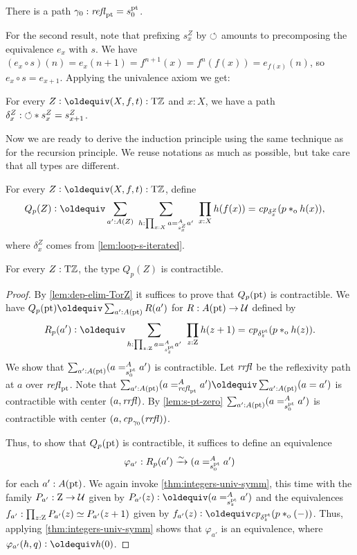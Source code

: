 \documentclass[a4,12pt]{amsart}
\begin{document}
\begin{lemma}\label{lem:s-pt-zero}
  There is a path $\gamma_0 : \mathop{{\it refl}_{{\mathord{\mathrm{pt}}}}} = s^{\mathord{\mathrm{pt}}}_0$. 
\end{lemma}

For the second result, note that prefixing $s^Z_x$ by ${\circlearrowleft}$ 
amounts to precomposing the equivalence $e_x$ with $s$. 
We have $(e_x\circ s)(n) = e_x(n+1) = f^{n+1}(x) = f^n(f(x)) =e_{f(x)}(n)$,
so $e_x\circ s = e_{x+1}$. Applying the univalence axiom we get:

\begin{lemma}\label{lem:loop-s-iterated}
  For every $Z\defeq(X,f,t):\TorZ$ and $x:X$, we have a path
  ${\delta^Z_x}: {\circlearrowleft} * s^Z_x = s^Z_{x+1}$. 
\end{lemma}

Now we are ready to derive the induction principle using the same 
technique as for the recursion principle. We reuse notations as much as
possible, but take care that all types are different.

\begin{definition}\label{def:guided-null-hmtps-dep}
For every $Z\defeq(X,f,t):\TorZ$, define
\begin{align*}\label{eq:TBD}
Q_p(Z)&\defeq \sum_{a' : A(Z)}~\sum_{h : \prod_{x:X} a =^A_{s^Z_x} a'}~\prod_{x:X} h(f(x)) = \cp{\delta^Z_x}(p\cto h(x)),
\end{align*}
where $\delta^Z_x$ comes from \cref{lem:loop-s-iterated}.
\end{definition}


\begin{lemma}\label{lem:guided-null-hmtps-dep}
  For every $Z:{\mathrm{T}\mathbb{Z}}$, the type $Q_p(Z)$ is contractible.
\end{lemma}
\begin{proof}
  By \cref{lem:dep-elim-TorZ} it suffices to prove that $Q_p({\mathord{\mathrm{pt}}})$ is contractible.
  We have $Q_p(\pt)\jdeq \sum_{a':A(\pt)} R(a')$ for $R : A({\mathord{\mathrm{pt}}}) \to \mathcal{U}$ defined by
  \[
    R_p(a') \defeq \sum_{h : \prod_{z:\zet} a =^A_{s^\pt_z} a'}~
    \prod_{z:\zet} h(z+1) = \cp{\delta^\pt_z}(p \cto h(z)).
  \]
  We show that $\sum_{a':A({\mathord{\mathrm{pt}}})} (a =^A_{s^{\mathord{\mathrm{pt}}}_0} {a'})$ is contractible.
  Let $\mathit{rrfl}$ be the reflexivity path at $a$ over $\mathop{{\it refl}_{{\mathord{\mathrm{pt}}}}}$.
  Note that $\sum_{a':A(\pt)} (a =^A_{\refl{\pt}} a') \jdeq \sum_{a':A(\pt)} (a = a')$
  is contractible with center $(a,\mathit{rrfl})$. By \cref{lem:s-pt-zero}
  $\sum_{a':A({\mathord{\mathrm{pt}}})} (a =^A_{s^{\mathord{\mathrm{pt}}}_0} {a'})$ is contractible with center
  $(a,\mathit{cp}_{\gamma_0}(\mathit{rrfl}))$.

  Thus, to show that $Q_p({\mathord{\mathrm{pt}}})$ is contractible,
  it suffices to define an equivalence
  \[
    \varphi_{a'} : R_p(a') \xrightarrow{\sim}{} (a =^A_{s^{\mathord{\mathrm{pt}}}_0} {a'})
  \]
  for each $a' : A({\mathord{\mathrm{pt}}})$.
  We again invoke \cref{thm:integers-univ-symm},
  this time with the family $P_{a'} : \mathrm{Z} \to \mathcal{U}$ given 
  by $P_{a'}(z) \defeq (a =^A_{s^\pt_z} {a'})$
  and the equivalences $f_{a'} : \prod_{z:\mathrm{Z}} P_{a'}(z)\simeq P_{a'}(z+1)$ 
  given by $f_{a'}(z) \defeq \cp{\delta^\pt_z}(p \cto ({-}))$.
  Thus, applying \cref{thm:integers-univ-symm}
  shows that $\varphi_{a'}$ is an equivalence,
  where $\varphi_{a'}(h,q) \defeq h(0)$.
\end{proof}
\end{document}

